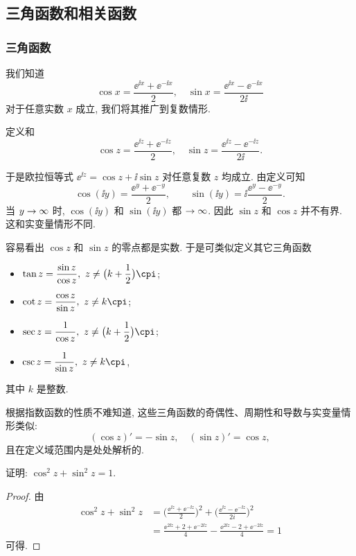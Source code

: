 \subsection{三角函数和相关函数}

\subsubsection{三角函数}

我们知道
  \[
    \cos x=\frac{\ee^{\ii x}+\ee^{-\ii x}}2,\quad
    \sin x=\frac{\ee^{\ii x}-\ee^{-\ii x}}{2\ii}
  \]
对于任意实数 $x$ 成立,
我们将其推广到复数情形.

\begin{definition}
  定义和
  \[
    \cos z=\frac{\ee^{\ii z}+\ee^{-\ii z}}2,\quad
    \sin z=\frac{\ee^{\ii z}-\ee^{-\ii z}}{2\ii}.
  \]
\end{definition}

于是欧拉恒等式 \alert{$\ee^{\ii z}=\cos z+\ii\sin z$ 对任意复数 $z$ 均成立}.
由定义可知
\[
  \cos(\ii y)=\frac{\ee^y+\ee^{-y}}2,\qquad
  \sin(\ii y)=\ii\frac{\ee^y-\ee^{-y}}2.
\]
当 $y\rightarrow\infty$ 时, $\cos(\ii y)$ 和 $\sin(\ii y)$ 都 $\rightarrow\infty$.
因此 \alert{$\sin z$ 和 $\cos z$ 并不有界}. 
这和实变量情形不同.

容易看出 $\cos z$ 和 $\sin z$ 的零点都是实数.
于是可类似定义其它三角函数
\begin{itemize}[addsep]
  \item {} $\tan z=\dfrac{\sin z}{\cos z},\ z\neq\bigl(k+\dfrac12\bigr)\cpi$;
  \item {} $\cot z=\dfrac{\cos z}{\sin z},\ z\neq k\cpi$;
  \item {} $\sec z=\dfrac{1}{\cos z},\ z\neq\bigl(k+\dfrac12\bigr)\cpi$;
  \item {} $\csc z=\dfrac{1}{\sin z},\ z\neq k\cpi$,
\end{itemize}
其中 $k$ 是整数.

根据指数函数的性质不难知道, 这些三角函数的奇偶性、周期性和导数与实变量情形类似:
  \[
    (\cos z)'=-\sin z,\quad
    (\sin z)'=\cos z,
  \]
且在定义域范围内是处处解析的.

\begin{example}
  证明: $\cos^2z+\sin^2z=1$.
\end{example}
\begin{proof}
  由
  \begin{align*}
    \cos^2z+\sin^2z&
    =\biggl(\frac{\ee^{\ii z}+\ee^{-\ii z}}2\biggr)^2
      +\biggl(\frac{\ee^{\ii z}-\ee^{-\ii z}}{2i}\biggr)^2\\&
    =\frac{\ee^{2\ii z}+2+\ee^{-2\ii z}}4-\frac{\ee^{2\ii z}-2+\ee^{-2\ii z}}4
    =1
  \end{align*}
  可得.
\end{proof}


